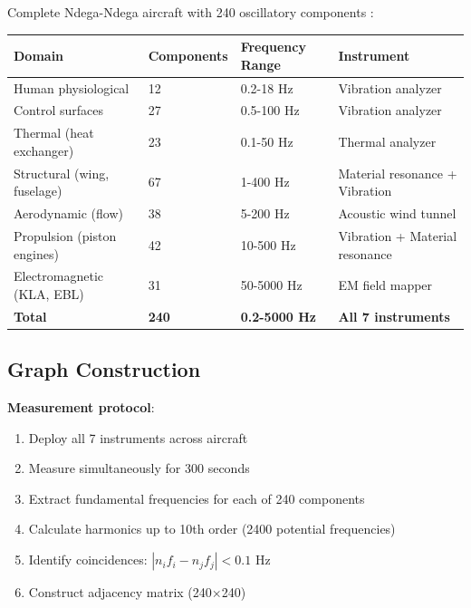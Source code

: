 \documentclass[12pt,a4paper]{article}
\begin{document}
{{{{{{{Complete Ndega-Ndega aircraft with 240 oscillatory components \cite{sachikonye2024ndega_ndega}:

\begin{center}
\begin{tabular}{llll}
\toprule
\textbf{Domain} & \textbf{Components} & \textbf{Frequency Range} & \textbf{Instrument} \\
\midrule
Human physiological & 12 & 0.2-18 Hz & Vibration analyzer \\
Control surfaces & 27 & 0.5-100 Hz & Vibration analyzer \\
Thermal (heat exchanger) & 23 & 0.1-50 Hz & Thermal analyzer \\
Structural (wing, fuselage) & 67 & 1-400 Hz & Material resonance + Vibration \\
Aerodynamic (flow) & 38 & 5-200 Hz & Acoustic wind tunnel \\
Propulsion (piston engines) & 42 & 10-500 Hz & Vibration + Material resonance \\
Electromagnetic (KLA, EBL) & 31 & 50-5000 Hz & EM field mapper \\
\midrule
\textbf{Total} & \textbf{240} & \textbf{0.2-5000 Hz} & \textbf{All 7 instruments} \\
\bottomrule
\end{tabular}
\end{center}

\subsection{Graph Construction}

\textbf{Measurement protocol}:
\begin{enumerate}
\item Deploy all 7 instruments across aircraft
\item Measure simultaneously for 300 seconds
\item Extract fundamental frequencies for each of 240 components
\item Calculate harmonics up to 10th order (2400 potential frequencies)
\item Identify coincidences: $|n_i f_i - n_j f_j| < 0.1$ Hz
\item Construct adjacency matrix (240×240)
\end{enumerate}

}}}}}}}
\end{document}
